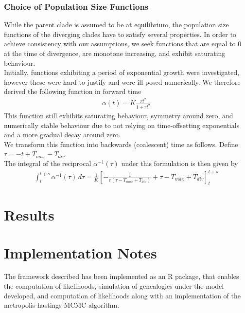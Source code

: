 \documentclass{ieeeaccess}
\theoremstyle{definition}
\begin{document}
\subsubsection{Choice of Population Size Functions} 
While the parent clade is assumed to be at equilibrium, the population size functions of the diverging clades have to satisfy several properties. 
In order to achieve consistency with our assumptions, we seek functions that are equal to $0$ at the time of divergence, are monotone increasing, and exhibit saturating behaviour. \\
Initially, functions exhibiting a period of exponential growth were investigated, however these were hard to justify and were ill-posed numerically.
We therefore derived the following function in forward time 
\begin{gather}
\alpha(t) = K\frac{rt^2}{1+rt^2}
\end{gather} 
This function still exhibits saturating behaviour, symmetry around zero, and numerically stable behaviour due to not relying on time-offsetting exponentials and a more gradual decay around zero.\\
We transform this function into backwards (coalescent) time as follows. 
Define $\tau = -t + T_{max} - T_{div}$.\\
The integral of the reciprocal $\alpha^{-1}(\tau)$ under this formulation is then given by 
\begin{gather}
\int_{t}^{t+s}\alpha^{-1}(\tau)\,d\tau = \frac{1}{K}\left[-\frac{1}{r(\tau-T_{max}+T_{div})}+\tau-T_{max}+T_{div}\right]_{t}^{t+s}
\end{gather}
\section{Results}
\section{Implementation Notes}
The framework described has been implemented as an R package, that enables the computation of likelihoods, simulation of genealogies under the model developed, and computation of likelihoods along with an implementation of the metropolis-hastings MCMC algorithm.
\end{document}
